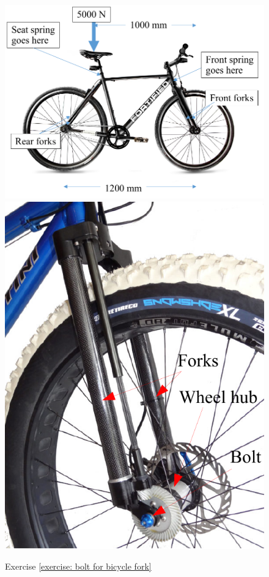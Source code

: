 \documentclass[
10pt,
a4paper,
openany,
svgnames,
]{book}
\begin{document}
\begin{exercises}
  \begin{figure}[h]
    \centering
    \includegraphics[scale=0.6]{pictures/Bolt/bicycle-dimension}
    \includegraphics[scale=0.5]{pictures/Bolt/bicycle-fork}
    \caption{Exercise \ref{exercise: bolt for bicycle fork}}
    \label{fig: bicycle dimension for exercise}
  \end{figure}
  

\end{exercises}
\end{document}

